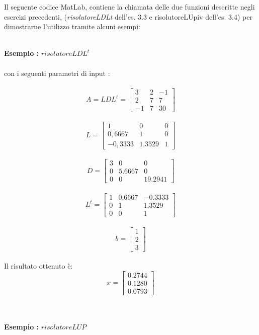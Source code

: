 Il seguente codice MatLab, contiene la chiamata delle due funzioni descritte negli esercizi precedenti, (\textit{risolutoreLDLt}  dell'es. 3.3 e risolutoreLUpiv dell'es. 3.4) per dimostrarne l'utilizzo tramite alcuni esempi:\\\

\begin{description}
\item \textbf{Esempio :} \textit{$risolutoreLDL^t$}\\\\
	con i seguenti parametri di input :\\\	 
	\[
	A = LDL^t =\begin{bmatrix}
		 3 & 2 & -1 \\ 
		 2 & 7 &  7 \\
		-1 & 7 & 30 
	\end{bmatrix}
	\]\\
	\[
	L =\begin{bmatrix}
		   1   &   0    & 0 \\ 
		0,6667 &   1    & 0 \\
	   -0,3333 & 1.3529 & 1 
	\end{bmatrix}
	\]\\ 
	\[
	D =\begin{bmatrix}
		3 &   0    &   0    \\ 
		0 & 5.6667 &   0    \\
		0 &   0    & 19.2941 
	\end{bmatrix}
	\]\\ 
	\[
	L^t =\begin{bmatrix}
		1 & 0.6667 & -0.3333 \\ 
		0 &    1   &  1.3529 \\
		0 &    0   &    1 
	\end{bmatrix}
	\]\\
	\[
	b =\begin{bmatrix}
		1 \\
		2 \\
		3 
	\end{bmatrix}
	\]\\	
	Il risultato ottenuto è:\\
	\[
	x =\begin{bmatrix}
		0.2744 \\
		0.1280 \\
		0.0793                
	\end{bmatrix}
	\]\\\\
\item \textbf{Esempio :} \textit{$risolutoreLUP$}\\\\	

\end{description}
